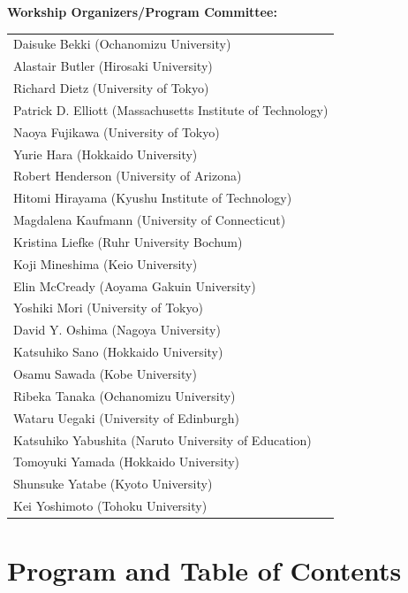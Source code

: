 \documentclass[12pt]{jarticle}
\begin{document}
\begin{center}
{\large \textbf{Workship Organizers/Program Committee:}} \\
\vspace*{1cm}
\begin{tabular}{l}
Daisuke Bekki (Ochanomizu University) \\
Alastair Butler (Hirosaki University) \\
Richard Dietz (University of Tokyo) \\
Patrick D. Elliott (Massachusetts Institute of Technology) \\
Naoya Fujikawa (University of Tokyo) \\
Yurie Hara (Hokkaido University) \\
Robert Henderson (University of Arizona) \\
Hitomi Hirayama (Kyushu Institute of Technology) \\
Magdalena Kaufmann (University of Connecticut) \\
Kristina Liefke (Ruhr University Bochum) \\
Koji Mineshima (Keio University) \\
Elin McCready (Aoyama Gakuin University) \\
Yoshiki Mori (University of Tokyo) \\
David Y. Oshima (Nagoya University) \\
Katsuhiko Sano (Hokkaido University) \\
Osamu Sawada (Kobe University) \\
Ribeka Tanaka (Ochanomizu University) \\
Wataru Uegaki (University of Edinburgh) \\
Katsuhiko Yabushita (Naruto University of Education) \\
Tomoyuki Yamada (Hokkaido University) \\
Shunsuke Yatabe (Kyoto University) \\
Kei Yoshimoto (Tohoku University) \\

\end{tabular}
\end{center}
\newpage
  
\section*{Program and Table of Contents}

\newcommand{\slot}[2]{\noindent \underline{#1 \  #2} \\}
\newcommand{\talk}[3]{
  \noindent #2 \\ 
  \indent\indent \textit{#1} \dotfill #3 
  \smallskip \\
  }
\newcommand{\talkk}[3]{
  \noindent #2 \\ 
  \indent\indent \textit{#1}
  \smallskip \\
  }
\end{document}
